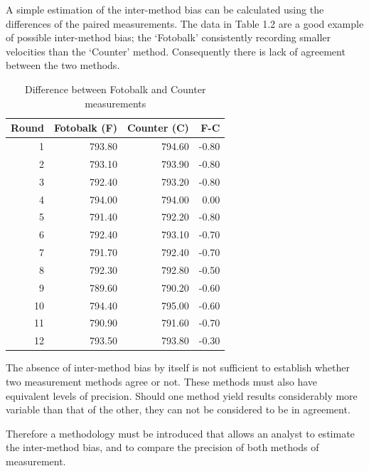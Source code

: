 \documentclass[12pt, a4paper]{report}
\theoremstyle{plain}
\theoremstyle{definition}
\theoremstyle{remark}
\begin{document}
	A simple estimation of the inter-method bias can be calculated
	using the differences of the paired measurements. The data in
	Table 1.2 are a good example of possible inter-method bias; the
	`Fotobalk' consistently recording smaller velocities than the
	`Counter' method. Consequently there is lack of agreement between
	the two methods.
	\newpage
	\begin{table}[h!]
		\begin{center}
			
			\begin{tabular}{rrrr}
				\hline
				Round& Fotobalk (F) & Counter (C) & F-C \\
				\hline
				1 & 793.80 & 794.60 & -0.80 \\
				2 & 793.10 & 793.90 & -0.80 \\
				3 & 792.40 & 793.20 & -0.80 \\
				4 & 794.00 & 794.00 & 0.00 \\
				5 & 791.40 & 792.20 & -0.80 \\
				6 & 792.40 & 793.10 & -0.70 \\
				7 & 791.70 & 792.40 & -0.70 \\
				8 & 792.30 & 792.80 & -0.50 \\
				9 & 789.60 & 790.20 & -0.60 \\
				10 & 794.40 & 795.00 & -0.60 \\
				11 & 790.90 & 791.60 & -0.70 \\
				12 & 793.50 & 793.80 & -0.30 \\
				\hline
			\end{tabular}
			\caption{Difference between Fotobalk and Counter measurements}
		\end{center}
	\end{table}
	
	\bigskip
	
	\noindent The absence of inter-method bias by itself is not
	sufficient to establish whether two measurement methods agree or
	not. These methods must also have equivalent levels of precision.
	Should one method yield results considerably more variable than
	that of the other, they can not be considered to be in agreement.
	
	Therefore a methodology must be introduced that allows an analyst
	to estimate the inter-method bias, and to compare the precision of
	both methods of measurement.
\end{document}
